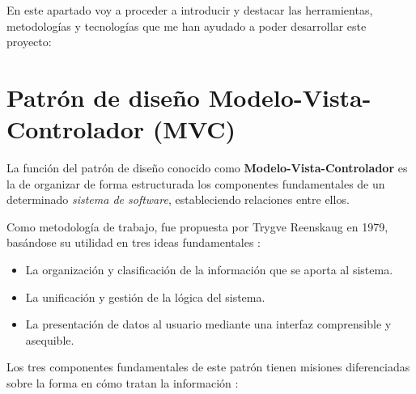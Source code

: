 
\begin{comment}
	Esta parte de la memoria tiene como objetivo presentar las técnicas metodológicas y las herramientas de desarrollo que se han utilizado para llevar a cabo el proyecto. Si se han estudiado diferentes alternativas de metodologías, herramientas, bibliotecas se puede hacer un resumen de los aspectos más destacados de cada alternativa, incluyendo comparativas entre las distintas opciones y una justificación de las elecciones realizadas. 
No se pretende que este apartado se convierta en un capítulo de un libro dedicado a cada una de las alternativas, sino comentar los aspectos más destacados de cada opción, con un repaso somero a los fundamentos esenciales y referencias bibliográficas para que el lector pueda ampliar su conocimiento sobre el tema.
\end{comment}

En este apartado voy a proceder a introducir y destacar las herramientas, metodologías y tecnologías que me han ayudado a poder desarrollar este proyecto:

\section{Patrón de diseño Modelo-Vista-Controlador (MVC)}

La función del patrón de diseño conocido como \textbf{Modelo-Vista-Controlador} es la de organizar de forma estructurada los componentes fundamentales de un determinado \textit{sistema de software}, estableciendo relaciones entre ellos.

Como metodología de trabajo, fue propuesta por Trygve Reenskaug en 1979, basándose su utilidad en tres ideas fundamentales \cite{campusmvp:mvc}:

\begin{itemize}
\item La organización y clasificación de la información que se aporta al sistema.
\item La unificación y gestión de la lógica del sistema.
\item La presentación de datos al usuario mediante una interfaz comprensible y asequible.
\end{itemize}

Los tres componentes fundamentales de este patrón tienen misiones diferenciadas sobre la forma en cómo tratan la información \cite{easyappcode:mvc}: 

